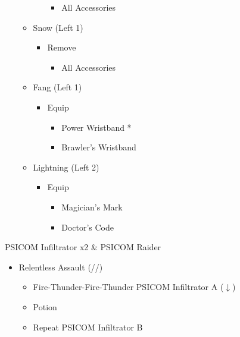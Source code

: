 \begin{paracol}{2}
\begin{menu}
\begin{itemize}
\begin{itemize}
\begin{itemize}
\begin{itemize}
						            \item All Accessories
					            \end{itemize}
				      \end{itemize}
				\item Snow (Left 1)
				      \begin{itemize}
					      \item Remove
					            \begin{itemize}
						            \item All Accessories
					            \end{itemize}
				      \end{itemize}
				\item Fang (Left 1)
				      \begin{itemize}
					      \item Equip
					            \begin{itemize}
						            \item Power Wristband *
						            \item Brawler's Wristband
					            \end{itemize}
				      \end{itemize}
				\item Lightning (Left 2)
				      \begin{itemize}
					      \item Equip
					            \begin{itemize}
						            \item Magician's Mark
						            \item Doctor's Code
					            \end{itemize}
				      \end{itemize}
			\end{itemize}
		\end{itemize}
	\end{menu}
	\renewcommand{\fourth}{[4] Relentless Assault (\rav/\rav/\com)}
	\renewcommand{\fifth}{[5] Aggression (\com/\rav/\com)}
	\switchcolumn*
	\begin{battle}{PSICOM Infiltrator x2 \& PSICOM Raider}
		\begin{itemize}
			\item \fourth
			      \begin{itemize}
				      \item Fire-Thunder-Fire-Thunder PSICOM Infiltrator A ($\downarrow$)
				      \item Potion
				      \item Repeat PSICOM Infiltrator B

\end{itemize}
\end{itemize}
\end{battle}
\end{paracol}
